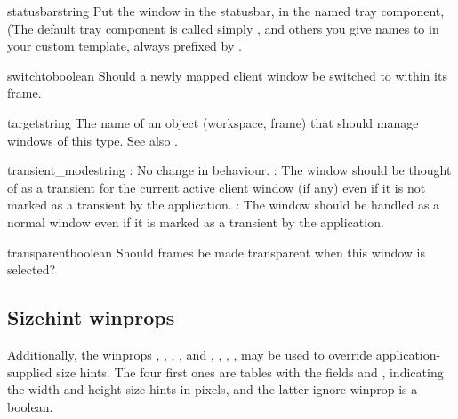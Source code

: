 \begin{winprop}{statusbar}{string}
    Put the window in the statusbar, in the named tray component,
    (The default tray component is called simply , 
    and others you give names to in your custom template, always 
    prefixed by .
\end{winprop}


\begin{winprop}{switchto}{boolean}
    Should a newly mapped client window be switched to within
    its frame.
\end{winprop}
        

\begin{winprop}{target}{string}
    The name of an object (workspace, frame) that should manage 
    windows of this type. See also .
\end{winprop}

        
\begin{winprop}{transient_mode}{string}
    : No change in behaviour. :
    The window should be thought of as a transient for the current
    active client window (if any) even if it is not marked as a
    transient by the application. : The window should 
    be handled as a normal window even if it is marked as a
    transient by the application. 
\end{winprop}


\begin{winprop}{transparent}{boolean}
    Should frames be made transparent when this window is selected? \\
\end{winprop}


\subsection{Sizehint winprops}

Additionally, the winprops 
,
,
,
,
and
,
,
,
,
may be used to override application-supplied size hints. The four
first ones are tables with the fields  and , indicating
the width and height size hints in pixels, and the latter ignore
winprop is a boolean. 

